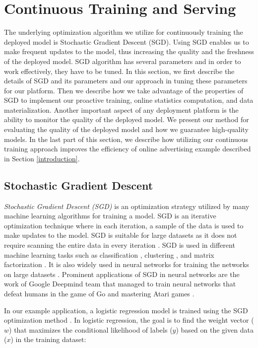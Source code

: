 \section{Continuous Training and Serving} \label{continuous-training-serving}
The underlying optimization algorithm we utilize for continuously training the deployed model is Stochastic Gradient Descent (SGD).
Using SGD enables us to make frequent updates to the model, thus increasing the quality and the freshness of the deployed model.
SGD algorithm has several parameters and in order to work effectively, they have to be tuned.
In this section, we first describe the details of SGD and its parameters and our approach in tuning these parameters for our platform.
Then we describe how we take advantage of the properties of SGD to implement our proactive training, online statistics computation, and data materialization.
Another important aspect of any deployment platform is the ability to monitor the quality of the deployed model.
We present our method for evaluating the quality of the deployed model and how we guarantee high-quality models.
In the last part of this section, we describe how utilizing our continuous training approach improves the efficiency of online advertising example described in Section \ref{introduction}.

\subsection{Stochastic Gradient Descent} \label{sgd}
\textit{Stochastic Gradient Descent (SGD)} is an optimization strategy utilized by many machine learning algorithms for training a model.
SGD is an iterative optimization technique where in each iteration, a sample of the data is used to make updates to the model.
SGD is suitable for large datasets as it does not require scanning the entire data in every iteration \cite{bottou2010large}.
SGD is used in different machine learning tasks such as classification \cite{zhang2004solving, macmahan2013}, clustering \cite{bottou1995convergence}, and matrix factorization \cite{koren2009matrix,  funk2006netflix}.
It is also widely used in neural networks for training the networks on large datasets \cite{dean2012large}.
Prominent applications of SGD in neural networks are the work of Google Deepmind team that managed to train neural networks that defeat humans in the game of Go \cite{silver2016mastering} and mastering Atari games \cite{mnih2013playing}.

In our example application, a logistic regression model is trained using the SGD optimization method \cite{macmahan2013}.
In logistic regression, the goal is to find the weight vector ($w$) that maximizes the conditional likelihood of labels ($y$) based on the given data ($x$) in the training dataset:

